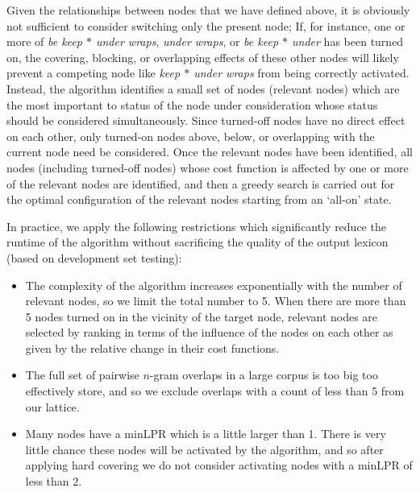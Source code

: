 \documentclass[11pt,letterpaper]{article}
\newcommand{\gap}{$*$\xspace}
\newcommand{\ex}[1]{\textit{#1}\xspace}
\begin{document}

Given the relationships between nodes that we have defined above, it is obviously not sufficient to consider switching only the present node; If, for instance, one or more of \ex{be keep \gap under wraps}, \ex{under wraps}, or \ex{be keep \gap under} has been turned on, the covering, blocking, or overlapping effects of these other nodes will likely prevent a competing node like \ex{keep \gap under wraps} from being correctly activated. Instead, the algorithm identifies a small set of nodes (relevant nodes) which are the most important to status of the node under consideration whose status should be considered simultaneously. Since turned-off nodes have no direct effect on each other, only turned-on nodes above, below, or overlapping with the current node need be considered.  Once the relevant nodes have been identified, all nodes (including turned-off nodes) whose cost function is affected by one or more of the relevant nodes are identified, and then a greedy search is carried out for the optimal configuration of the relevant nodes starting from an `all-on' state. 

In practice, we apply the following restrictions which significantly reduce the runtime of the algorithm without sacrificing the quality of the output lexicon (based on development set testing):

\begin{itemize}
\item The complexity of the algorithm increases exponentially with the number of relevant nodes, so we limit the total number to 5. When there are more than 5 nodes turned on in the vicinity of the target node, relevant nodes are selected by ranking in terms of the influence of the nodes on each other as given by the relative change in their cost functions.
\item The full set of pairwise $n$-gram overlaps in a large corpus is too big too effectively store, and so we exclude overlaps with a count of less than 5 from our lattice.
\item Many nodes have a minLPR which is a little larger than 1. There is very little chance these nodes will be activated by the algorithm, and so after applying hard covering we do not consider activating nodes with a minLPR of less than 2.
\end{itemize}
\end{document}
